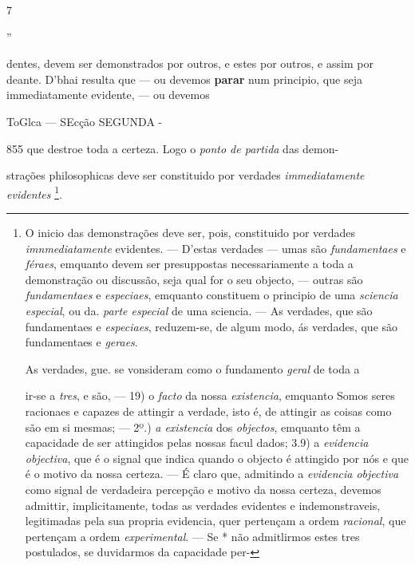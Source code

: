 7

”

dentes, devem ser demonstrados por outros, e estes por outros, e assim por deante. D'bhai resulta que --- ou devemos \textbf{parar} num principio, que seja immediatamente evidente, --- ou devemos

ToGlca --- SEcção SEGUNDA -

855 que destroe toda a certeza. Logo o \emph{ponto de partida} das demon-

strações philosophicas deve ser constituido por verdades \emph{immediatamente evidentes} \footnote{O inicio das demonstrações deve ser, pois, constituido por verdades \emph{imnmediatamente} evidentes. --- D'estas verdades --- umas são \emph{fundamentaes} e \emph{féraes}, emquanto devem ser presuppostas necessariamente a toda a demonstração ou discussão, seja qual for o seu objecto, --- outras são \emph{fundamentaes} e \emph{especiaes}, emquanto constituem o principio de uma \emph{sciencia especial}, ou da. \emph{parte especial} de uma sciencia. --- As verdades, que são fundamentaes e \emph{especiaes}, reduzem-se, de algum modo, ás verdades, que são fundamentaes e \emph{geraes}.\par As verdades, gue. se vonsideram como o fundamento \emph{geral} de toda a\par ir-se a \emph{tres}, e são, --- 19) o \emph{facto} da nossa \emph{existencia}, emquanto Somos seres racionaes e capazes de attingir a verdade, isto é, de attingir as coisas como são em si mesmas; --- 2º.) \emph{a existencia} dos \emph{objectos}, emquanto têm a capacidade de ser attingidos pelas nossas facul dados; 3.9) a \emph{evidencia objectiva}, que é o signal que indica quando o objecto é attingido por nós e que é o motivo da nossa certeza. --- É claro que, admitindo a \emph{evidencia objectiva} como signal de verdadeira percepção e motivo da nossa certeza, devemos admittir, implicitamente, todas as verdades evidentes e indemonstraveis, legitimadas pela sua propria evidencia, quer pertençam a ordem \emph{racional}, que pertençam a ordem \emph{experimental}. --- Se * não admitlirmos estes tres postulados, se duvidarmos da capacidade per-}.

